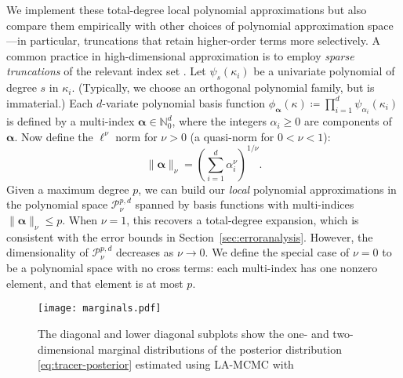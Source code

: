We implement these total-degree local polynomial approximations but also compare them empirically with other choices of polynomial approximation space---in particular, truncations that retain higher-order terms more selectively. A common practice in high-dimensional  approximation is to employ \emph{sparse truncations} of the relevant index set \citep{BlatmanSudret2011}. Let $\psi_s(\kappa_i)$ be a univariate polynomial of degree $s$ in $\kappa_i$. (Typically, we choose an orthogonal polynomial family, but  is immaterial.) Each $d$-variate polynomial basis function $\phi_{\bm{\alpha}}(\kappa) \coloneqq \prod_{i=1}^{d} \psi_{\alpha_i}(\kappa_i)$ is defined by a multi-index $\bm{\alpha} \in \mathbb{N}_0^d$, where the integers $\alpha_i \geq 0$ are components of $\bm{\alpha}$. Now define the $\ell^\nu$ norm for $\nu > 0$ (a quasi-norm for $0 < \nu < 1$): 
\begin{equation}
    \|\bm{\alpha}\|_{\nu} = \left(\sum_{i=1}^{d} \alpha_i^{\nu}\right)^{1/\nu}.
\end{equation}
Given a maximum degree $p$, we can build our \emph{local} polynomial approximations in the polynomial space $\mathcal{P}_\nu^{p,d}$ spanned by basis functions with multi-indices $\|\bm{\alpha}\|_{\nu} \leq p$. When $\nu=1$, this recovers a total-degree expansion, which is consistent with the error bounds in Section~\ref{sec:erroranalysis}. However, the dimensionality of $\mathcal{P}_\nu^{p,d}$ decreases as $\nu \rightarrow 0$. We define the special case of $\nu=0$ to be a polynomial space with no cross terms: each multi-index has one nonzero element, and that element is at most $p$. 

\begin{figure}[h!]
\centering
    \texttt{[image: marginals.pdf]} 
    \caption{The diagonal and lower diagonal subplots show the one- and two-dimensional marginal distributions of the posterior distribution \eqref{eq:tracer-posterior} estimated using LA-MCMC with }
    \label{fig:tracer-transport-marginals}
\end{figure}

